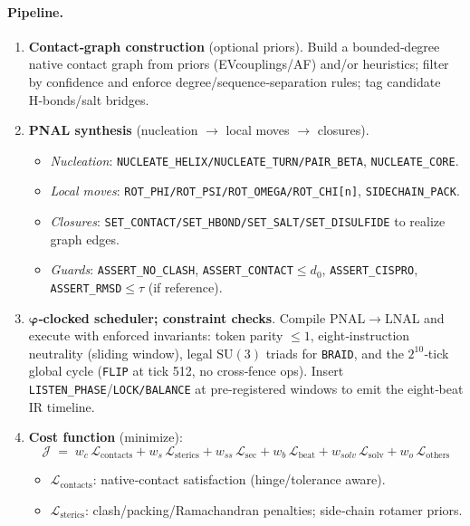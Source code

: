\documentclass[12pt,a4paper]{article}
\begin{document}
\paragraph{Pipeline.}
\begin{enumerate}
  \item \textbf{Contact‑graph construction} (optional priors). Build a bounded‑degree native contact graph from priors (EVcouplings/AF) and/or heuristics; filter by confidence and enforce degree/sequence‑separation rules; tag candidate H‑bonds/salt bridges.
  \item \textbf{PNAL synthesis} (nucleation $\to$ local moves $\to$ closures).
  \begin{itemize}
    \item \textit{Nucleation}: \texttt{NUCLEATE\_HELIX/NUCLEATE\_TURN/PAIR\_BETA}, \texttt{NUCLEATE\_CORE}.
    \item \textit{Local moves}: \texttt{ROT\_PHI/ROT\_PSI/ROT\_OMEGA/ROT\_CHI[n]}, \texttt{SIDECHAIN\_PACK}.
    \item \textit{Closures}: \texttt{SET\_CONTACT/SET\_HBOND/SET\_SALT/SET\_DISULFIDE} to realize graph edges.
    \item \textit{Guards}: \texttt{ASSERT\_NO\_CLASH}, \texttt{ASSERT\_CONTACT$\le d_0$}, \texttt{ASSERT\_CISPRO}, \texttt{ASSERT\_RMSD$\le\tau$} (if reference).
  \end{itemize}
  \item \textbf{$\boldsymbol{\varphi}$‑clocked scheduler; constraint checks}. Compile PNAL$\to$LNAL and execute with enforced invariants: token parity $\le 1$, eight‑instruction neutrality (sliding window), legal $\mathrm{SU}(3)$ triads for \texttt{BRAID}, and the $2^{10}$‑tick global cycle (\texttt{FLIP} at tick 512, no cross‑fence ops). Insert \texttt{LISTEN\_PHASE}/\texttt{LOCK/BALANCE} at pre‑registered windows to emit the eight‑beat IR timeline.
  \item \textbf{Cost function} (minimize):
  \[
  \mathcal{J} \;=\; w_c \,\mathcal{L}_{\mathrm{contacts}} + w_s \,\mathcal{L}_{\mathrm{sterics}} + w_{ss}\,\mathcal{L}_{\mathrm{sec}} + w_b\,\mathcal{L}_{\mathrm{beat}} + w_{solv}\,\mathcal{L}_{\mathrm{solv}} + w_o\,\mathcal{L}_{\mathrm{others}}
  \]
  \begin{itemize}
    \item $\mathcal{L}_{\mathrm{contacts}}$: native‑contact satisfaction (hinge/tolerance aware).
    \item $\mathcal{L}_{\mathrm{sterics}}$: clash/packing/Ramachandran penalties; side‑chain rotamer priors.

\end{itemize}
\end{enumerate}
\end{document}
